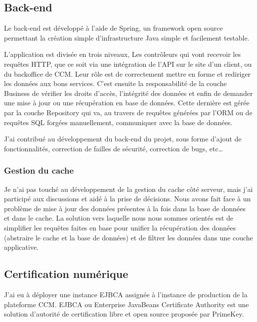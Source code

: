 \documentclass[12pt, a4paper]{report}
\begin{document}
\subsection{Back-end}
Le back-end est développé à l'aide de Spring, un framework open source permettant la création simple d'infrastructure Java simple et facilement testable.\newline

L'application est divisée en trois niveaux,\newline
Les contrôleurs qui vont recevoir les requêtes HTTP, que ce soit via une intégration de l'API sur le site d'un client, ou du backoffice de CCM. Leur rôle est de correctement mettre en forme et rediriger les données aux bons services.\newline
C'est ensuite la responsabilité de la couche Business de vérifier les droits d'accès, l'intégrité des données et enfin de demander une mise à jour ou une récupération en base de données.\newline
Cette dernière est gérée par la couche Repository qui va, au travers de requêtes générées par l'ORM ou de requêtes SQL forgées manuellement, communiquer avec la base de données.\newline

J'ai contribué au développement du back-end du projet, sous forme d'ajout de fonctionnalités, correction de failles de sécurité, correction de bugs, etc\ldots
\subsubsection{Gestion du cache}
Je n'ai pas touché au développement de la gestion du cache côté serveur, mais j'ai participé aux discussions et aidé à la prise de décisions.
Nous avons fait face à un problème de mise à jour des données présentes à la fois dans la base de données et dans le cache. La solution vers laquelle nous nous sommes orientés est de simplifier les requêtes faites en base pour unifier la récupération des données (abstraire le cache et la base de données) et de filtrer les données dans une couche applicative.
\subsection{Certification numérique}
J'ai eu à déployer une instance EJBCA assignée à l'instance de production de la plateforme CCM.\newline
EJBCA ou Enterprise JavaBeans Certificate Authority est une solution d'autorité de certification libre et open source proposée par PrimeKey.
\end{document}
